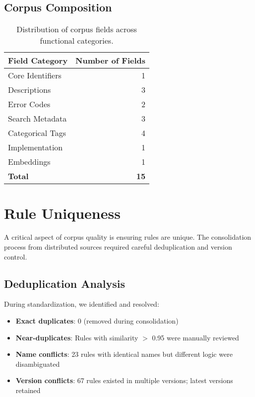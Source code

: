 \subsection{Corpus Composition}

\begin{table}[ht]
\centering
\begin{tabular}{lr}
\toprule
\textbf{Field Category} & \textbf{Number of Fields} \\
\midrule
Core Identifiers & 1 \\
Descriptions & 3 \\
Error Codes & 2 \\
Search Metadata & 3 \\
Categorical Tags & 4 \\
Implementation & 1 \\
Embeddings & 1 \\
\midrule
\textbf{Total} & \textbf{15} \\
\bottomrule
\end{tabular}
\caption{Distribution of corpus fields across functional categories.}
\label{tab:corpus-composition}
\end{table}

\section{Rule Uniqueness}

A critical aspect of corpus quality is ensuring rules are unique. The consolidation process from distributed sources required careful deduplication and version control.

\subsection{Deduplication Analysis}

During standardization, we identified and resolved:
\begin{itemize}[leftmargin=*,itemsep=2pt,topsep=2pt]
 \item \textbf{Exact duplicates}: 0 (removed during consolidation)
 \item \textbf{Near-duplicates}: Rules with similarity $>$ 0.95 were manually reviewed
 \item \textbf{Name conflicts}: 23 rules with identical names but different logic were disambiguated
 \item \textbf{Version conflicts}: 67 rules existed in multiple versions; latest versions retained
\end{itemize}

